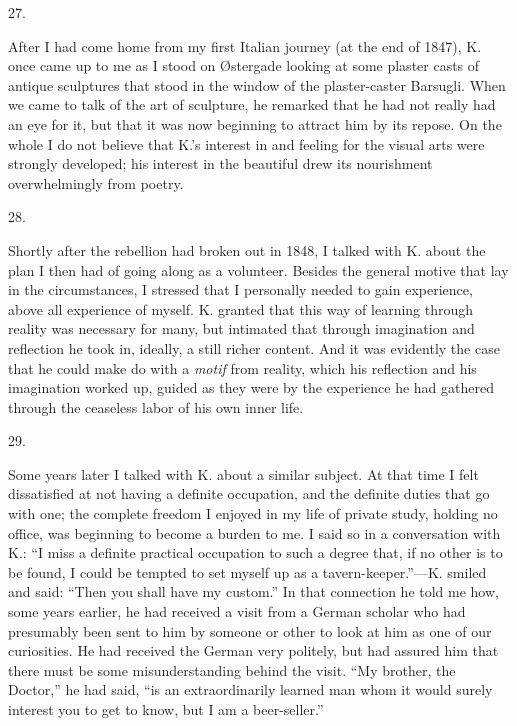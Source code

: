 \documentclass[12pt,a4paper,openany]{book}
\newcommand{\secnum}[1]{\par\begin{center}#1\end{center}\par\nobreak}
\newcommand{\opage}[1]{\marginnote{\footnotesize\textit{[#1]}}}
\begin{document}
\secnum{27.}

\opage{357}After I had come home from my first Italian
journey (at the end of 1847), K. once came up to me
as I stood on Østergade looking at some plaster casts
of antique sculptures that stood in the window of the plaster-caster
Barsugli. When we came to talk of the art of sculpture, he remarked
that he had not really had an eye for
it, but that it was now beginning to attract him by
its repose. On the whole I do not believe that K.'s interest in
and feeling for the visual arts were strongly developed; his
interest in the beautiful drew its nourishment overwhelmingly
from poetry.

\secnum{28.}

Shortly after the rebellion had broken out in 1848, I talked
with K. about the plan I then had of going along
as a volunteer. Besides the general
motive that lay in the circumstances, I stressed that I personally
needed to gain experience, above all experience of myself. K.
granted that this way of learning through reality was
necessary for many, but intimated that through
imagination and reflection he took in, ideally, a still richer
content. And it was evidently the case that
he could make do with a \emph{motif} from reality, which
his reflection and his imagination worked up, guided as they
were by the experience he had gathered through the ceaseless
labor of his own inner life.

\secnum{29.}

Some years later I talked with K. about a similar
subject. At that time I felt dissatisfied at not
having a definite occupation, and the definite duties
that go with one; the complete freedom I
enjoyed in my life of private study, holding no office, was beginning to become
a burden to me. I said so in a conversation with K.:
``I miss a definite practical occupation to such a degree
\opage{358}that, if no other is to be found, I could be tempted to set
myself up as a tavern-keeper.''---K. smiled and said:
``Then you shall have my custom.'' In that connection
he told me how, some years earlier, he had received
a visit from a German scholar who had presumably been sent to him
by someone or other to look at him as one
of our curiosities. He had received the German
very politely, but had assured him that there must be
some misunderstanding behind the visit. ``My brother, the Doctor,''
he had said, ``is an extraordinarily learned man
whom it would surely interest you to get to know,
but I am a beer-seller.''
\end{document}
